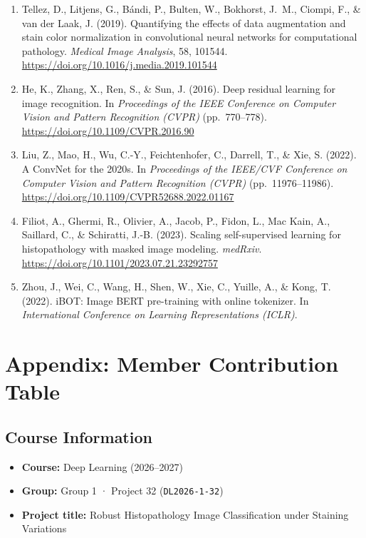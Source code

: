 \documentclass[11pt,a4paper]{article}
\begin{document}
\begin{enumerate}[label=\arabic*.,leftmargin=*]
        Structure-preserving color normalization and sparse stain separation for
        histological images. \textit{IEEE Transactions on Medical Imaging}, 35(8),
        1962--1971. \url{https://doi.org/10.1109/TMI.2016.2529665}
  \item Tellez, D., Litjens, G., B\'andi, P., Bulten, W., Bokhorst, J.~M., Ciompi, F.,
        \& van der Laak, J. (2019). Quantifying the effects of data augmentation and
        stain color normalization in convolutional neural networks for computational
        pathology. \textit{Medical Image Analysis}, 58, 101544.
        \url{https://doi.org/10.1016/j.media.2019.101544}
  \item He, K., Zhang, X., Ren, S., \& Sun, J. (2016). Deep residual learning for
        image recognition. In \textit{Proceedings of the IEEE Conference on Computer
        Vision and Pattern Recognition (CVPR)} (pp.~770--778).
        \url{https://doi.org/10.1109/CVPR.2016.90}
  \item Liu, Z., Mao, H., Wu, C.-Y., Feichtenhofer, C., Darrell, T., \& Xie, S.
        (2022). A ConvNet for the 2020s. In \textit{Proceedings of the IEEE/CVF
        Conference on Computer Vision and Pattern Recognition (CVPR)}
        (pp.~11976--11986). \url{https://doi.org/10.1109/CVPR52688.2022.01167}
  \item Filiot, A., Ghermi, R., Olivier, A., Jacob, P., Fidon, L., Mac Kain, A.,
        Saillard, C., \& Schiratti, J.-B. (2023). Scaling self-supervised learning for
        histopathology with masked image modeling. \textit{medRxiv}.
        \url{https://doi.org/10.1101/2023.07.21.23292757}
  \item Zhou, J., Wei, C., Wang, H., Shen, W., Xie, C., Yuille, A., \& Kong, T.
        (2022). iBOT: Image BERT pre-training with online tokenizer. In
        \textit{International Conference on Learning Representations (ICLR)}.
\end{enumerate}

\section{Appendix: Member Contribution Table}

\subsection*{Course Information}
\begin{itemize}
  \item \textbf{Course:} Deep Learning (2026--2027)
  \item \textbf{Group:} Group 1 · Project 32 (\texttt{DL2026-1-32})
  \item \textbf{Project title:} Robust Histopathology Image Classification under
        Staining Variations
\end{itemize}
\end{document}
